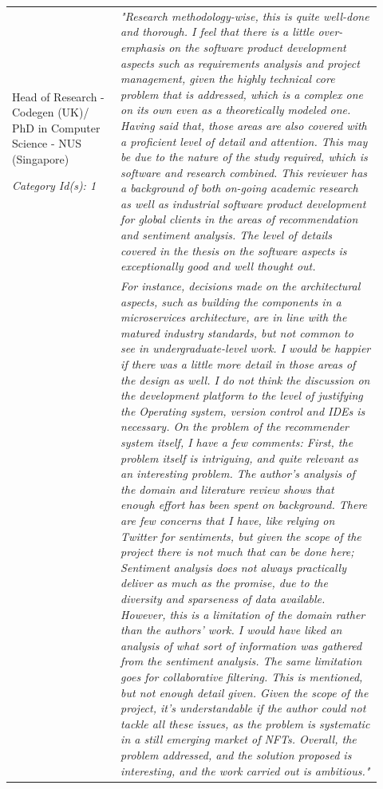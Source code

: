 \begin{longtable}{|p{0.27\linewidth}|p{0.655\linewidth}|}
Head of Research - Codegen (UK)/ 
PhD in Computer Science - NUS (Singapore)

\textit{Category Id(s): 1}
&
\textit{"Research methodology-wise, this is quite well-done and thorough. I feel that there is a little over-emphasis on the software product development aspects such as requirements analysis and project management, given the highly technical core problem that is addressed, which is a complex one on its own even as a theoretically modeled one. Having said that, those areas are also covered with a proficient level of detail and attention. This may be due to the nature of the study required, which is software and research combined.
This reviewer has a background of both on-going academic research as well as industrial software product development for global clients in the areas of recommendation and sentiment analysis. The level of details covered in the thesis on the software aspects is exceptionally good and well thought out.
}
\\

&

\textit{
For instance, decisions made on the architectural aspects, such as building the components in a microservices architecture, are in line with the matured industry standards, but not common to see in undergraduate-level work. I would be happier if there was a little more detail in those areas of the design as well.
I do not think the discussion on the development platform to the level of justifying the Operating system, version control and IDEs is necessary.  
On the problem of the recommender system itself, I have a few comments:  
First, the problem itself is intriguing, and quite relevant as an interesting problem. The author's analysis of the domain and literature review shows that enough effort has been spent on background. There are few concerns that I have, like relying on Twitter for sentiments, but given the scope of the project there is not much that can be done here; Sentiment analysis does not always practically deliver as much as the promise, due to the diversity and sparseness of data available. However, this is a limitation of the domain rather than the authors' work. I would have liked an analysis of what sort of information was gathered from the sentiment analysis. The same limitation goes for collaborative filtering. This is mentioned, but not enough detail given. Given the scope of the project, it's understandable if the author could not tackle all these issues, as the problem is systematic in a still emerging market of NFTs.  
Overall, the problem addressed, and the solution proposed is interesting, and the work carried out is ambitious."} \\


\end{longtable}
